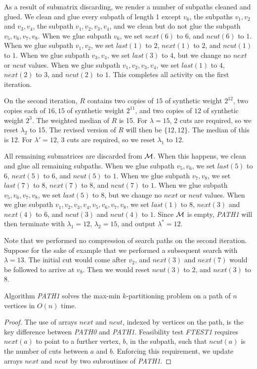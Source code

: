 {{{As a result of submatrix discarding, we render a number of subpaths cleaned and glued.
We clean and glue every subpath of length 1 except $v_6$, the subpaths $v_1,v_2$ and $v_3,v_4$, the subpath $v_1,v_2,v_3,v_4$, and we clean but do not glue the subpath $v_5,v_6,v_7,v_8$.
When we glue subpath $v_6$, we set $next(6)$ to $6$, and $ncut(6)$ to $1$.
When we glue subpath $v_1,v_2$, we set $last(1)$ to $2$, $next(1)$ to $2$, and $ncut(1)$ to $1$.
When we glue subpath $v_3,v_4$, we set $last(3)$ to $4$, but we change no $next$ or $ncut$ values.
When we glue subpath $v_1,v_2,v_3,v_4$, we set $last(1)$ to $4$, $next(2)$ to $3$, and $ncut(2)$ to $1$. 
This completes all activity on the first iteration.

On the second iteration,
$R$ contains two copies of
$15$ of synthetic weight $2^{12}$,
two copies each of $16,15$ of synthetic weight $2^{11}$,
and two copies of $12$ of synthetic weight $2^{3}$.
The weighted median of $R$ is 15.
For $\lambda = 15$, 2 cuts are required,
so we reset $\lambda_2$ to 15.
The revised version of $R$ will then be
$\{12,12\}$.
The median of this is 12.
For $\lambda '= 12$, 3 cuts are required,
so we reset $\lambda_1$ to 12.

All remaining submatrices are discarded from $\cal M$.
When this happens, we clean and glue all remaining subpaths.
When we glue subpath $v_5,v_6$, we set $last(5)$ to $6$, $next(5)$ to $6$, and $ncut(5)$ to $1$.
When we glue subpath $v_7,v_8$, we set $last(7)$ to $8$, $next(7)$ to $8$, and $ncut(7)$ to $1$.
When we glue subpath $v_5,v_6,v_7,v_8$, we set $last(5)$ to $8$,
but we change no $next$ or $ncut$ values.
When we glue subpath $v_1,v_2,v_3,v_4,v_5,v_6,v_7,v_8$, we set $last(1)$ to $8$, $next(3)$ and $next(4)$ to $6$,
and $ncut(3)$ and $ncut(4)$ to $1$.
Since $\cal M$ is empty,
{\it PATH1} will then terminate with $\lambda_1 = 12$, 
$\lambda_2 = 15$, and output $\lambda^*=12$.

Note that we performed no compression of search paths 
on the second iteration.
Suppose for the sake of example that we performed a subsequent search
with $\lambda = 13$.
The initial cut would come after $v_2$,
and $next(3)$ and $next(7)$ would be followed to arrive at $v_8$.
Then we would reset $ncut(3)$ to $2$, and $next(3)$ to $8$.

\begin{theorem}
\label{thm:3:4}
Algorithm {\it PATH1} solves the max-min $k$-partitioning problem
on a path of $n$ vertices in $O(n)$ time.
\end{theorem}
\begin{proof}
The use of arrays $next$ and $ncut$, indexed by vertices on the
path, is the key difference between {\it PATH0} and {\it PATH1}. Feasibility test
{\it FTEST1} requires $next(a)$ to point to a further vertex, $b$, in the subpath,
such that $ncut(a)$ is the number of cuts between $a$ and $b$. Enforcing this 
requirement, we update arrays $next$ and $ncut$ by two subroutines of {\it PATH1}.


\end{proof}}}}
